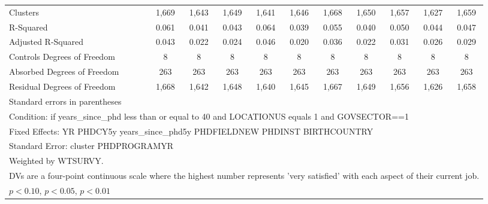 \begin{table}[htbp]
\begin{tabular}{l*{10}{c}}
Clusters&       1,669         &       1,643         &       1,649         &       1,641         &       1,646         &       1,668         &       1,650         &       1,657         &       1,627         &       1,659         \\
R-Squared&       0.061         &       0.041         &       0.043         &       0.064         &       0.039         &       0.055         &       0.040         &       0.050         &       0.044         &       0.047         \\
Adjusted R-Squared&       0.043         &       0.022         &       0.024         &       0.046         &       0.020         &       0.036         &       0.022         &       0.031         &       0.026         &       0.029         \\
Controls Degrees of Freedom&           8         &           8         &           8         &           8         &           8         &           8         &           8         &           8         &           8         &           8         \\
Absorbed Degrees of Freedom&         263         &         263         &         263         &         263         &         263         &         263         &         263         &         263         &         263         &         263         \\
Residual Degrees of Freedom&       1,668         &       1,642         &       1,648         &       1,640         &       1,645         &       1,667         &       1,649         &       1,656         &       1,626         &       1,658         \\
\hline\hline
\multicolumn{11}{l}{\footnotesize Standard errors in parentheses}\\
\multicolumn{11}{l}{\footnotesize Condition: if years\_since\_phd less than or equal to 40 and LOCATIONUS equals 1 and GOVSECTOR==1}\\
\multicolumn{11}{l}{\footnotesize Fixed Effects: YR PHDCY5y years\_since\_phd5y PHDFIELDNEW PHDINST BIRTHCOUNTRY}\\
\multicolumn{11}{l}{\footnotesize Standard Error: cluster PHDPROGRAMYR}\\
\multicolumn{11}{l}{\footnotesize Weighted by WTSURVY.}\\
\multicolumn{11}{l}{\footnotesize DVs are a four-point continuous scale where the highest number represents 'very satisfied' with each aspect of their current job.}\\
\multicolumn{11}{l}{\footnotesize \sym{*} \(p<0.10\), \sym{**} \(p<0.05\), \sym{***} \(p<0.01\)}\\
\end{tabular}
\end{table}
